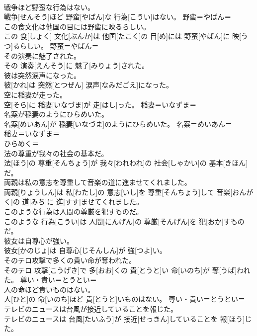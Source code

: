 \documentclass[8pt]{extreport}
\begin{document}
\begin{CJK}{UTF8}{min}
{\\	戦争ほど野蛮な行為はない。	
\\	戦争[せんそう]ほど 野蛮[やばん]な 行為[こうい]はない。	野蛮＝やばん＝ 
\\	この食文化は他国の目には野蛮に映るらしい。	
\\	この 食[しょく] 文化[ぶんか]は 他国[たこく]の 目[め]には 野蛮[やばん]に 映[うつ]るらしい。	野蛮＝やばん＝ 
\\	その演奏に魅了された。	
\\	その 演奏[えんそう]に 魅了[みりょう]された。	
\\	彼は突然涙声になった。	
\\	彼[かれ]は 突然[とつぜん] 涙声[なみだごえ]になった。	
\\	空に稲妻が走った。	
\\	空[そら]に 稲妻[いなづま]が 走[はし]った。	稲妻＝いなずま＝ 
\\	名案が稲妻のようにひらめいた。	
\\	名案[めいあん]が 稲妻[いなづま]のようにひらめいた。	名案＝めいあん＝ 
\\	稲妻＝いなずま＝ 
\\	ひらめく＝ 
\\	法の尊重が我々の社会の基本だ。	
\\	法[ほう]の 尊重[そんちょう]が 我々[われわれ]の 社会[しゃかい]の 基本[きほん]だ。	
\\	両親は私の意志を尊重して音楽の道に進ませてくれました。	
\\	両親[りょうしん]は 私[わたし]の 意志[いし]を 尊重[そんちょう]して 音楽[おんがく]の 道[みち]に 進[すす]ませてくれました。	
\\	このような行為は人間の尊厳を犯すものだ。	
\\	このような 行為[こうい]は 人間[にんげん]の 尊厳[そんげん]を 犯[おか]すものだ。	
\\	彼女は自尊心が強い。	
\\	彼女[かのじょ]は 自尊心[じそんしん]が 強[つよ]い。	
\\	そのテロ攻撃で多くの貴い命が奪われた。	
\\	そのテロ 攻撃[こうげき]で 多[おお]くの 貴[とうと]い 命[いのち]が 奪[うば]われた。	尊い・貴い＝とうとい＝ 
\\	人の命ほど貴いものはない。	
\\	人[ひと]の 命[いのち]ほど 貴[とうと]いものはない。	尊い・貴い＝とうとい＝ 
\\	テレビのニュースは台風が接近していることを報じた。	
\\	テレビのニュースは 台風[たいふう]が 接近[せっきん]していることを 報[ほう]じた。	
}
\end{CJK}
\end{document}
